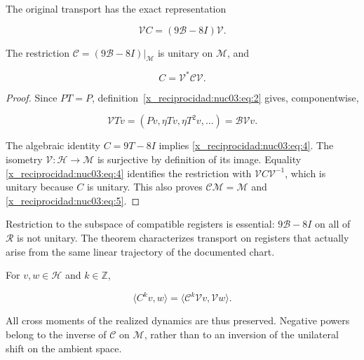 \begin{theorem}
\label{x_reciprocidad:nuc03:transporte}
The original transport has the exact representation

\begin{equation}
\boxed{\mathcal V C=(9\mathcal B-8I)\mathcal V.}
\label{x_reciprocidad:nuc03:eq:4}
\end{equation}

The restriction \(\mathcal C=(9\mathcal B-8I)|_{\mathcal M}\) is unitary on \(\mathcal M\), and

\begin{equation}
C=\mathcal V^*\mathcal C\mathcal V.
\label{x_reciprocidad:nuc03:eq:5}
\end{equation}
\end{theorem}

\begin{proof}
Since \(PT=P\), definition~\eqref{x_reciprocidad:nuc03:eq:2} gives, componentwise,

\[
\mathcal VT v=(Pv,\eta Tv,\eta T^2v,\ldots)=\mathcal B\mathcal Vv.
\]

The algebraic identity \(C=9T-8I\) implies \eqref{x_reciprocidad:nuc03:eq:4}. The isometry \(\mathcal V:\mathcal H\to\mathcal M\) is surjective by definition of its image. Equality \eqref{x_reciprocidad:nuc03:eq:4} identifies the restriction with \(\mathcal V C\mathcal V^{-1}\), which is unitary because \(C\) is unitary. This also proves \(\mathcal C\mathcal M=\mathcal M\) and \eqref{x_reciprocidad:nuc03:eq:5}.
\end{proof}

Restriction to the subspace of compatible registers is essential: \(9\mathcal B-8I\) on all of \(\mathcal R\) is not unitary. The theorem characterizes transport on registers that actually arise from the same linear trajectory of the documented chart.

\begin{corollary}
For \(v,w\in\mathcal H\) and \(k\in\mathbb Z\),

\begin{equation}
\langle C^kv,w\rangle
=\langle\mathcal C^k\mathcal Vv,\mathcal Vw\rangle.
\label{x_reciprocidad:nuc03:eq:6}
\end{equation}

All cross moments of the realized dynamics are thus preserved. Negative powers belong to the inverse of \(\mathcal C\) on \(\mathcal M\), rather than to an inversion of the unilateral shift on the ambient space.
\end{corollary}

